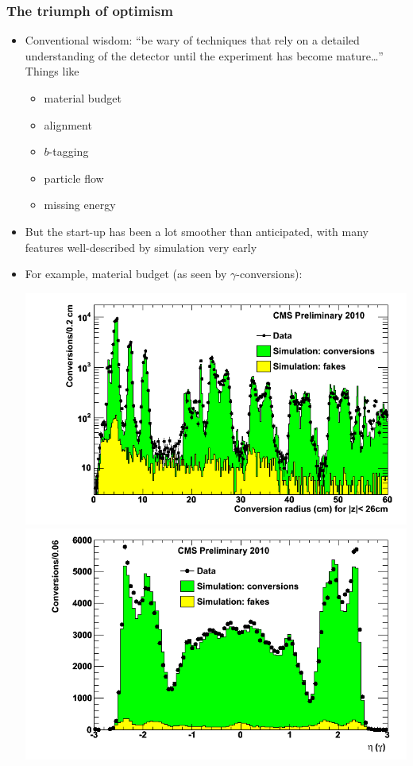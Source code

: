 \documentclass[compress]{beamer}
\begin{document}
\begin{frame}
\frametitle{The triumph of optimism}
\begin{itemize}
\item Conventional wisdom: ``be wary of techniques that rely on a
  detailed understanding of the detector until the experiment has
  become mature\ldots''  Things like
\begin{itemize}
\item material budget
\item alignment
\item $b$-tagging
\item particle flow
\item missing energy
\end{itemize}

\item But the start-up has been a lot smoother than anticipated, with
  many features well-described by simulation very early

\item<2> For example, material budget (as seen by $\gamma$-conversions):

\begin{center}
\includegraphics[height=3 cm]{material_conversions_r.png}
\includegraphics[height=3 cm]{material_conversions_eta.png}
\end{center}
\end{itemize}
\end{frame}
\end{document}
